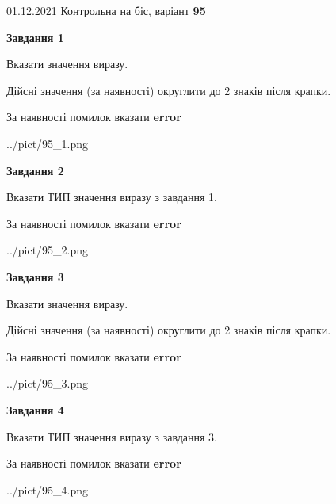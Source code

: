 \documentclass[11pt, ukrainian]{article}
\begin{document}
{01.12.2021 Контрольна на біс, варіант  \No \textbf { 95 }\par}
{
\begin {large}
{\begin {center}\textbf{Завдання 1}\end {center}}\par
Вказати значення виразу. \par
Дійсні значення (за наявності) округлити до 2 знаків після крапки. \par
За наявності помилок вказати \textbf{error}

\begin{center}
	{../pict/95_1.png}
\end{center}
\newpage

{\begin {center}\textbf{Завдання 2}\end {center}}\par
Вказати ТИП значення виразу з завдання 1. \par
За наявності помилок вказати \textbf{error}

\begin{center}
	{../pict/95_2.png}
\end{center}
\newpage

{\begin {center}\textbf{Завдання 3}\end {center}}\par
Вказати значення виразу. \par
Дійсні значення (за наявності) округлити до 2 знаків після крапки. \par
За наявності помилок вказати \textbf{error}

\begin{center}
	{../pict/95_3.png}
\end{center}
\newpage

{\begin {center}\textbf{Завдання 4}\end {center}}\par
Вказати ТИП значення виразу з завдання 3. \par
За наявності помилок вказати \textbf{error}

\begin{center}
	{../pict/95_4.png}
\end{center}
\newpage


\end{large}}
\end{document}
